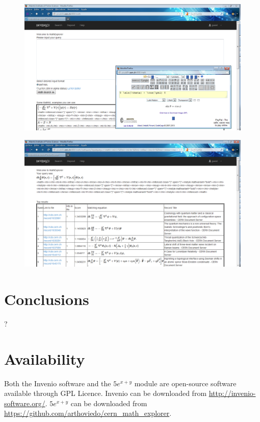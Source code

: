 \documentclass{sig-alternate}
\begin{document}
\begin{figure}
\centering
\begin{minipage}{.27\textwidth}
  \includegraphics[width=0.9\linewidth]{images/figures/input_interface.png}
  \label{fig:test1}
\end{minipage}%
\begin{minipage}{.27\textwidth}
  \includegraphics[width=0.9\linewidth]{images/figures/results_interface.png}
  \label{fig:test2}
\end{minipage}
\end{figure}

\section{Conclusions}
?

\section{Availability}
Both the Invenio software and the $5e^{x+y}$ module are open-source software available through GPL Licence. Invenio can be downloaded from \url{http://invenio-software.org/}. $5e^{x+y}$ can be downloaded from \\ \url{https://github.com/arthoviedo/cern_math_explorer}.

%

%
%
\end{document}
